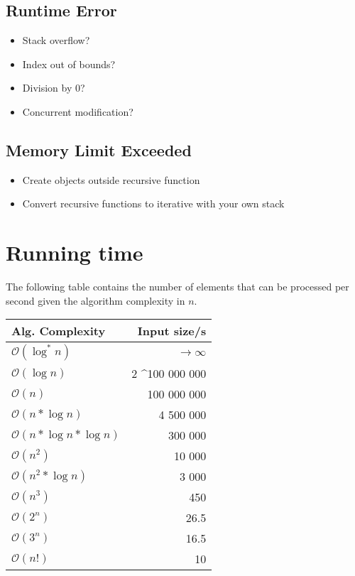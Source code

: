 \documentclass[8pt,a4paper,landscape,oneside]{amsart}
\newcommand{\bigO}{\mathcal{O}}
\begin{document}
\begin{multicols*}{3}
  \subsection{Runtime Error}
    \begin{itemize}
    \item Stack overflow?
    \item Index out of bounds?
    \item Division by $0$?
    \item Concurrent modification?
    \end{itemize}
  \subsection{Memory Limit Exceeded}
    \begin{itemize}
    \item Create objects outside recursive function
    \item Convert recursive functions to iterative with your own stack
    \end{itemize}
        
        
\section{Running time}
The following table contains the number of elements that can be processed per second given the algorithm complexity in $n$.
\begin{center}
\begin{tabular}{lr}
Alg. Complexity & Input size/s \\ \hline
$\bigO(\log^*{n})$   & $\rightarrow \infty$ \\
$\bigO(\log{n})$     & 2 \textasciicircum 100 000 000 \\
$\bigO(n)$           & 100 000 000 \\
$\bigO(n*\log{n})$   & 4 500 000 \\
$\bigO(n*\log{n}*\log{n})$ & 300 000 \\
$\bigO(n^2)$         & 10 000 \\
$\bigO(n^2*\log{n})$ & 3 000 \\
$\bigO(n^3)$         & 450 \\
$\bigO(2^n)$         & 26.5 \\
$\bigO(3^n)$         & 16.5 \\
$\bigO(n!)$          & 10
\end{tabular}
\end{center}



\end{multicols*}
\end{document}
